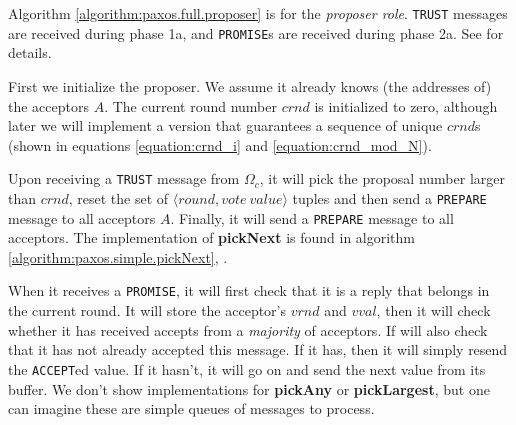 Algorithm \ref{algorithm:paxos.full.proposer}
 is for the \textit{proposer
role}.  \texttt{TRUST} messages are received during phase 1a, and
\texttt{PROMISE}s are received during phase 2a. See \cite{Lam01} for details.

First we initialize the proposer. We assume it already knows (the addresses
of) the acceptors $A$.  The current round number $crnd$ is initialized to
zero, although later we will implement a version that guarantees a sequence
of unique $crnd$s (shown in equations \ref{equation:crnd_i} and
\ref{equation:crnd_mod_N}).

Upon receiving a \texttt{TRUST} message from $\Omega_c$, it will pick the
proposal number larger than $crnd$, reset the set of
$\langle round, vote~value\rangle$ tuples and then send a
\texttt{PREPARE} message to all acceptors $A$.  Finally, it will
send a \texttt{PREPARE} message to all acceptors.
%
The implementation of \textbf{pickNext} is found in
algorithm \ref{algorithm:paxos.simple.pickNext},
.

When it receives a \texttt{PROMISE}, it will first check that it is a reply
that belongs in the current round.  It will store the acceptor's $vrnd$ and
$vval$, then it will check whether it has received accepts from a
\textit{majority} of acceptors.
If will also check that it has not already accepted this message.
If it has, then it will simply resend the \texttt{ACCEPT}ed value.
If it hasn't, it will go on and send the next value from its buffer.
We don't show implementations for \textbf{pickAny} or \textbf{pickLargest},
but one can imagine these are simple queues of messages to process.

